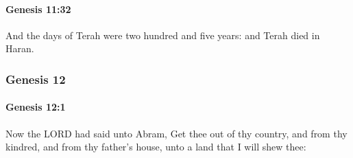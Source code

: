 		\paragraph{Genesis 11:32} %
			\label{GENESIS-11-32}

			And the days of Terah were two hundred and five years: and Terah died in Haran.

	\subsubsection{Genesis 12} %
		\label{GENESIS-12}

		\paragraph{Genesis 12:1} %
			\label{GENESIS-12-1}

			Now the LORD had said unto Abram, Get thee out of thy country, and from thy kindred, and from thy father's house, unto a land that I will shew thee:

